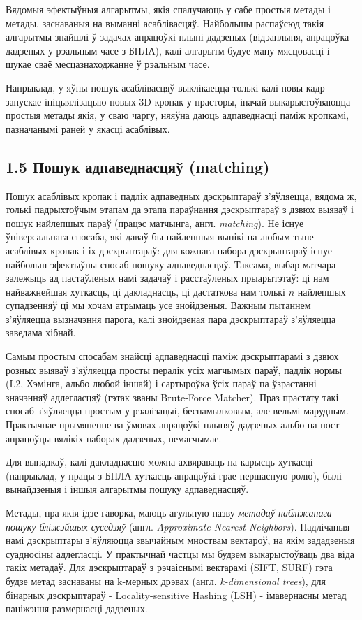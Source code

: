 Вядомыя эфектыўныя алгарытмы, якія спалучаюць у сабе простыя метады і метады, заснаваныя на выманні асаблівасцяў.
Найбольшы распаўсюд такія алгарытмы знайшлі ў задачах апрацоўкі плыні дадзеных (відэаплыня, апрацоўка дадзеных у рэальным часе з БПЛА),
калі алгарытм будуе мапу мясцовасці і шукае сваё месцазнаходжанне ў рэальным часе.

Напрыклад, у \cite{svo} яўны пошук асаблівасцяў выклікаецца толькі калі новы кадр запускае ініцыялізацыю новых 3D кропак у прасторы, іначай
выкарыстоўваюцца простыя метады якія, у сваю чаргу, няяўна даюць адпаведнасці паміж кропкамі, пазначанымі раней у якасці асаблівых.

\subsection*{1.5 Пошук адпаведнасцяў (matching)}

Пошук асаблівых кропак і падлік адпаведных дэскрыптараў з'яўляецца, вядома ж, толькі падрыхтоўчым этапам да этапа параўнання дэскрыптараў з
дзвюх выяваў і пошук найлепшых параў (працэс матчынга, англ. \textit{matching}). Не існуе ўніверсальнага спосаба, які даваў бы найлепшыя
вынікі на любым тыпе асаблівых кропак і іх дэскрыптараў: для кожнага набора дэскрыптараў існуе найбольш эфектыўны спосаб пошуку
адпаведнасцяў. Таксама, выбар матчара залежыць ад пастаўленых намі задачаў і расстаўленых прыарытэтаў: ці нам найважнейшая
хуткасць, ці дакладнасць, ці дастаткова нам толькі $n$ найлепшых супадзенняў ці мы хочам атрымаць усе знойдзеныя.
Важным пытаннем з'яўляецца вызначэння парога, калі знойдзеная пара дэскрыптараў з'яўляецца заведама хібнай.

Самым простым спосабам знайсці адпаведнасці паміж дэскрыптарамі з дзвюх розных выяваў з'яўляецца просты пералік усіх магчымых параў, падлік нормы
(L2, Хэмінга, альбо любой іншай) і сартыроўка ўсіх параў па ўзрастанні значэнняў адлегласцяў (гэтак званы Brute-Force Matcher). Праз прастату
такі спосаб з'яўляецца простым у рэалізацыі, беспамылковым, але вельмі марудным. Практычнае прымяненне ва ўмовах апрацоўкі плыняў дадзеных альбо на
пост-апрацоўцы вялікіх наборах дадзеных, немагчымае.

Для выпадкаў, калі дакладнасцю можна ахвяраваць на карысць хуткасці (напрыклад, у працы з БПЛА хуткасць апрацоўкі
грае першасную ролю), былі вынайдзеныя і іншыя алгарытмы пошуку адпаведнасцяў.

Метады, пра якія ідзе гаворка, маюць агульную назву \textit{метадаў набліжанага пошуку бліжэйшых суседзяў}
(англ. \textit{Approximate Nearest Neighbors}). Падлічаныя намі дэскрыптары з'яўляюцца звычайным мноствам вектароў,
на якім зададзеныя суадносіны адлегласці. У практычнай частцы мы будзем выкарыстоўваць два віда такіх метадаў.
Для дэскрыптараў з рэчаіснымі вектарамі (SIFT, SURF) гэта будзе метад заснаваны на k-мерных дрэвах
(англ. \textit{k-dimensional trees}), для бінарных дэскрыптараў - Locality-sensitive Hashing (LSH) - імавернасны
метад паніжэння размернасці дадзеных.

\newpage
